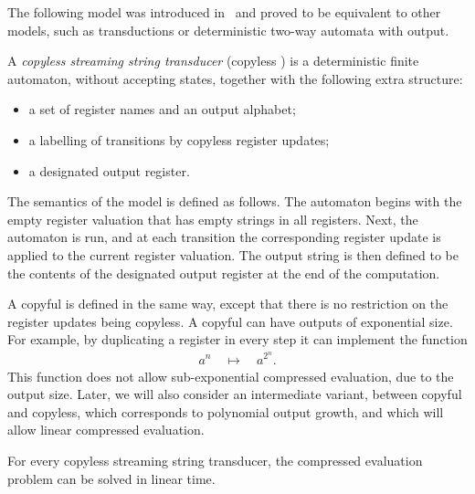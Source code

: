 \documentclass{article}
\begin{document}
The following model was introduced in~\cite{alurExpressivenessStreamingString2010} and proved to be equivalent to other models, such as \mso transductions or deterministic two-way automata with output.
\begin{definition}
    A \emph{copyless streaming string transducer} (copyless \sst) is a deterministic finite automaton, without accepting states, together with the following extra structure:
    \begin{itemize}
    \item a set of register names and an output alphabet;
    \item a labelling of transitions by copyless register updates;
    \item a designated output register.
    \end{itemize}
\end{definition}

The semantics of the model is defined as follows. The automaton begins with the empty register valuation that has empty strings in all registers. Next, the automaton is run, and at each transition the corresponding register update is applied to the current register valuation. The output string is then defined to be the contents of the designated output register at the end of the computation. 

A copyful \sst is defined in the same way, except that there is no restriction on the register updates being copyless. A copyful \sst can have outputs of exponential size. For example,  by duplicating a register in every step it can implement the function 
\begin{align*}
a^n \quad \mapsto \quad a^{2^n}.
\end{align*}
This function does not allow sub-exponential compressed evaluation, due to the output size. 
Later, we will also consider an intermediate variant, between copyful and copyless, which corresponds to polynomial output growth, and which will allow linear compressed evaluation.
 


\begin{theorem}\label{thm:sst} For every copyless streaming string transducer, the compressed evaluation problem can be solved in linear time.
\end{theorem}
\end{document}
